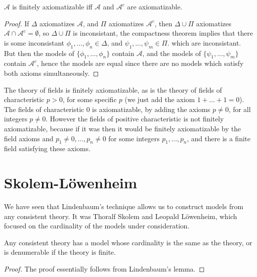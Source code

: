 \begin{theorem}
    $\mathcal{A}$ is finitely axiomatizable iff $\mathcal{A}$ and $\mathcal{A}^c$ are axiomatizable.
\end{theorem}
\begin{proof}
    If $\Delta$ axiomatizes $\mathcal{A}$, and $\Pi$ axiomatizes $\mathcal{A}^c$, then $\Delta \cup \Pi$ axiomatizes $\mathcal{A} \cap \mathcal{A}^c = \emptyset$, so $\Delta \cup \Pi$ is inconsistant, the compactness theorem implies that there is some inconsistant $\phi_1, \dots, \phi_n \in \Delta$, and $\psi_1, \dots, \psi_m \in \Pi$. which are inconsistant. But then the models of $\{ \phi_1, \dots, \phi_n \}$ contain $\mathcal{A}$, and the models of $\{ \psi_1, \dots, \psi_m \}$ contain $\mathcal{A}^c$, hence the models are equal since there are no models which satisfy both axioms simultaneously.
\end{proof}

\begin{example}
    The theory of fields is finitely axiomatizable, as is the theory of fields of characteristic $p > 0$, for some specific $p$ (we just add the axiom $1 + \dots + 1 = 0$). The fields of characteristic $0$ is axiomatizable, by adding the axioms $p \neq 0$, for all integers $p \neq 0$. However the fields of positive characteristic is not finitely axiomatizable, because if it was then it would be finitely axiomatizable by the field axioms and $p_1 \neq 0, \dots, p_n \neq 0$ for some integers $p_1, \dots, p_n$, and there is a finite field satisfying these axioms.
\end{example}

\section{Skolem-L\"{o}wenheim}

We have seen that Lindenbaum's technique allows us to construct models from any consistent theory. It was Thoralf Skolem and Leopald L\"{o}wenheim, which focused on the cardinality of the models under consideration.

\begin{theorem}
    Any consistent theory has a model whose cardinality is the same as the theory, or is denumerable if the theory is finite.
\end{theorem}
\begin{proof}
    The proof essentially follows from Lindenbaum's lemma.
\end{proof}

